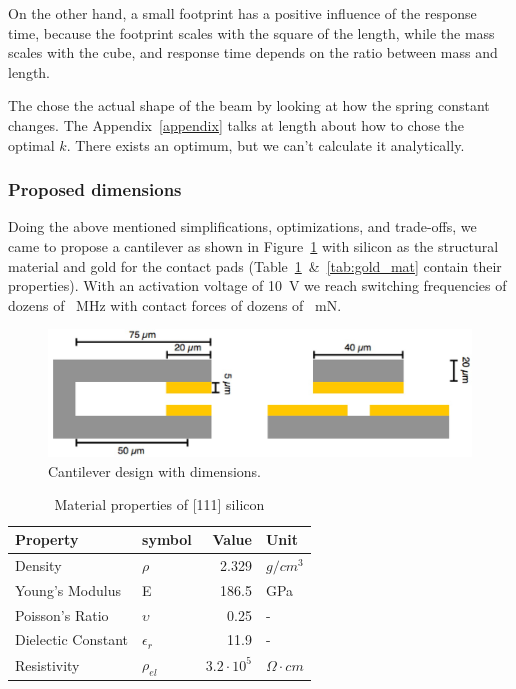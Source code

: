 On the other hand, a small footprint has a positive influence of the response time, because the footprint scales with the square of the length, while the mass scales with the cube, and response time depends on the ratio between mass and length.

The chose the actual shape of the beam by looking at how the spring constant changes.
The Appendix~\ref{appendix} talks at length about how to chose the optimal $k$.
There exists an optimum, but we can't calculate it analytically.

\subsubsection{Proposed dimensions}
\label{ssub:proposed_dimensions}

Doing the above mentioned simplifications, optimizations, and trade-offs, we came to propose a cantilever as shown in Figure~\ref{fig:cantilever_design} with silicon as the structural material and gold for the contact pads (Table~\ref{tab:silicium_mat}~\&~\ref{tab:gold_mat} contain their properties).
With an activation voltage of \SI{10}{\volt} we reach switching frequencies of dozens of \SI{}{\mega\hertz} with contact forces of dozens of \SI{}{\milli\newton}.


\begin{figure}[h]
	\centering
	\includegraphics[width=12cm]{fig/cant_design.jpg}
    \caption{Cantilever design with dimensions.}
\label{fig:cantilever_design}
\end{figure}

\begin{table}
	\centering
	\begin{tabular}{l l r l} 
		\toprule
		Property & symbol & Value & Unit \\
		\midrule
		Density & $\rho$ & 2.329 & $g/cm^3$ \\
		Young's Modulus & E & 186.5 & GPa \\ 
		Poisson's Ratio & $\upsilon$ & 0.25 & - \\ 
		Dielectic Constant & $\epsilon_r$ & 11.9 & - \\
		Resistivity & $\rho_{el}$ & $3.2\cdot10^5 $ & $\Omega \cdot cm$ \\
		\bottomrule
	\end{tabular}
	\caption{Material properties of [111] silicon}
	\label{tab:silicium_mat}
\end{table}


